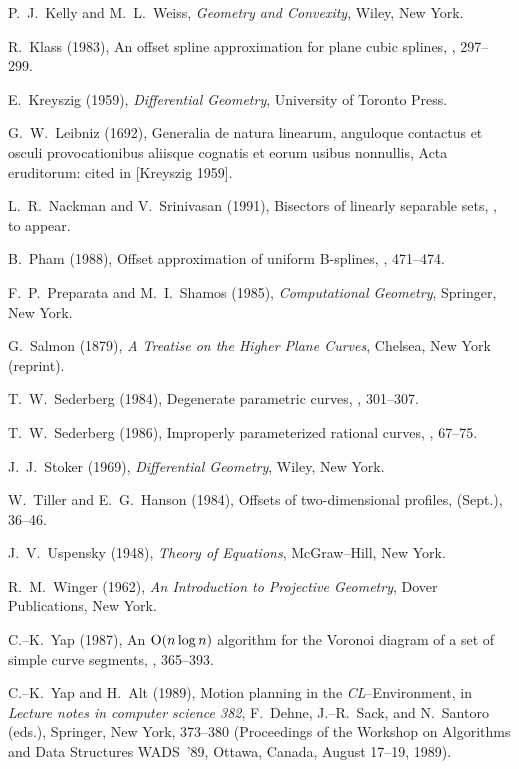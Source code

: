 \begin{thebibliography}{99}
P.~J.~Kelly and M.~L.~Weiss, {\it Geometry and Convexity}, Wiley,
New York.

R.~Klass (1983), An offset spline approximation for plane cubic
splines, , 297--299.

E.~Kreyszig (1959), {\it Differential Geometry}, University of
Toronto Press.

G.~W.~Leibniz (1692), Generalia de natura linearum, anguloque
contactus et osculi provocationibus aliisque cognatis et eorum
usibus nonnullis, Acta eruditorum: cited in [Kreyszig 1959].

L.~R.~Nackman and V.~Srinivasan (1991), Bisectors of linearly
separable sets, , to appear.

B.~Pham (1988), Offset approximation of uniform B-splines,
, 471--474.

F.~P.~Preparata and M.~I.~Shamos (1985), {\it Computational
Geometry}, Springer, New York.

G.~Salmon (1879), {\it A Treatise on the Higher Plane Curves},
Chelsea, New York (reprint).

T.~W.~Sederberg (1984), Degenerate parametric curves, ,
301--307.

T.~W.~Sederberg (1986), Improperly parameterized rational curves,
, 67--75.

J.~J.~Stoker (1969), {\it Differential Geometry}, Wiley, New York.

W.~Tiller and E.~G.~Hanson (1984), Offsets of two-dimensional
profiles,  (Sept.), 36--46.

J.~V.~Uspensky (1948), {\it Theory of Equations}, McGraw--Hill,
New York.

R.~M.~Winger (1962), {\it An Introduction to Projective Geometry},
Dover Publications, New York.

C.--K.~Yap (1987), An ${\rm O}(n\log n)$ algorithm for the Voronoi
diagram of a set of simple curve segments, , 365--393.

C.--K.~Yap and H.~Alt (1989), Motion planning in the {\it
CL\/}--Environment, in {\it Lecture notes in computer science 382},
F.~Dehne, J.--R.~Sack, and N.~Santoro (eds.), Springer, New York,
373--380 (Proceedings of the Workshop on Algorithms and Data
Structures WADS~'89, Ottawa, Canada, August 17--19, 1989).

\end{thebibliography}

